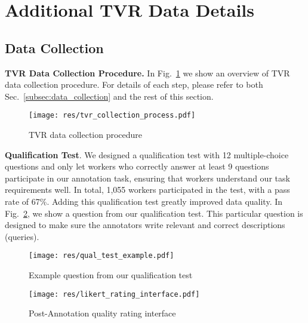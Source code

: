 \documentclass[runningheads]{llncs}
\begin{document}
\appendix
\section{Additional TVR Data Details}



\subsection{Data Collection}\label{subsec:appendix_data_collection}

\noindent\textbf{TVR Data Collection Procedure.}
In Fig.~\ref{fig:tvr_collection_overview} we show an overview of TVR data collection procedure.
For details of each step, please refer to both Sec.~\ref{subsec:data_collection} and the rest of this section.

\begin{figure}[!ht]
  \centering
  \texttt{[image: res/tvr\_collection\_process.pdf]}
  \caption{TVR data collection procedure}
  \label{fig:tvr_collection_overview}
\end{figure}

\kern2mm
\noindent\textbf{Qualification Test}.
We designed a qualification test with 12 multiple-choice questions and only let workers who correctly answer at least 9 questions participate in our annotation task, ensuring that workers understand our task requirements well.
In total, 1,055 workers participated in the test, with a pass rate of 67\%. 
Adding this qualification test greatly improved data quality. In Fig.~\ref{fig:qual_test_example}, we show a question from our qualification test. 
This particular question is designed to make sure the annotators write relevant and correct descriptions (queries). 

\begin{figure}[!ht]
  \centering
  \texttt{[image: res/qual\_test\_example.pdf]}
  \caption{Example question from our qualification test}
  \label{fig:qual_test_example}
\end{figure}


\begin{figure}[!t]
  \centering
  \texttt{[image: res/likert\_rating\_interface.pdf]}
  \caption{Post-Annotation quality rating interface}
  \label{fig:likert_scale_interface}
\end{figure}
\end{document}
